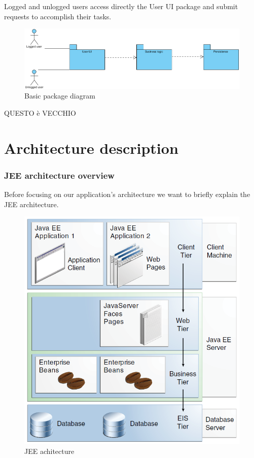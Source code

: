 \documentclass[10pt,a4paper,titlepage]{article}
\begin{document}
Logged and unlogged users access directly the User UI package and submit requests to accomplish their tasks.

\begin{figure}[h!]
\centering
\includegraphics[width=\linewidth]{./images/basic-package}
\caption[Basic package]{Basic package diagram}
\label{fig:basic-package}
\end{figure}

QUESTO è VECCHIO
\part{Architecture description}
\section{JEE architecture overview}
Before focusing on our application's architecture we want to briefly explain the JEE architecture.

\begin{figure}[h]
\centering
\includegraphics[width=\linewidth]{./images/JEE-arch}
\caption[JEE architecture]{JEE achitecture}
\label{fig:JEE-arch}
\end{figure}
\end{document}
